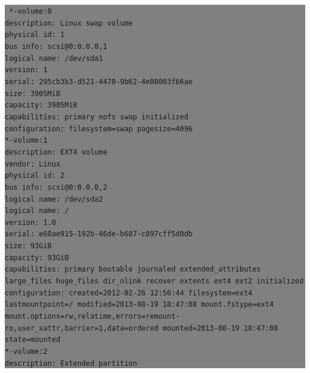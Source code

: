 \documentclass[12pt]{article}
\begin{document}
\colorbox{grey}{\parbox[t]{0.95\linewidth}{ \vspace*{0.5cm} { 
{\tt
              *-volume:0\\
                   description: Linux swap volume\\
                   physical id: 1\\
                   bus info: scsi@0:0.0.0,1\\
                   logical name: /dev/sda1\\
                   version: 1\\
                   serial: 295cb3b3-d521-4470-9b62-4e08003f66ae\\
                   size: 3905MiB\\
                   capacity: 3905MiB\\
                   capabilities: primary nofs swap initialized\\
                   configuration: filesystem=swap pagesize=4096\\
              *-volume:1\\
                   description: EXT4 volume\\
                   vendor: Linux\\
                   physical id: 2\\
                   bus info: scsi@0:0.0.0,2\\
                   logical name: /dev/sda2\\
                   logical name: /\\
                   version: 1.0\\
                   serial: e60ae915-192b-46de-b687-c897cff5d0db\\
                   size: 93GiB\\
                   capacity: 93GiB\\
                   capabilities: primary bootable journaled extended\_attributes large\_files huge\_files dir\_nlink recover extents ext4 ext2 initialized\\
                   configuration: created=2012-02-26 12:56:44 filesystem=ext4 lastmountpoint=/ modified=2013-08-19 18:47:08 mount.fstype=ext4 mount.options=rw,relatime,errors=remount-ro,user\_xattr,barrier=1,data=ordered mounted=2013-08-19 18:47:08 state=mounted\\
              *-volume:2\\
                   description: Extended partition\\
}}}}
\end{document}

